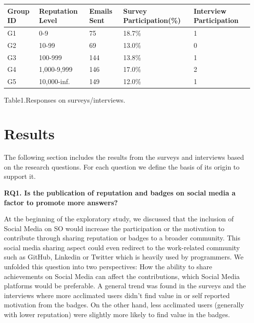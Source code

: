 \documentclass{sigchi}
\begin{document}
\begin{center}
    \begin{tabular}{ | p{1.0cm} | p{1.6cm} | P{0.9cm} | P{1.8cm} | P{1.4cm} |}
    \hline
    \textbf{Group ID} & \textbf{Reputation Level} & \textbf{Emails Sent} & \textbf{Survey Participation(\%)} & \textbf{Interview Participation } \\ \hline
    G1 & 0-9 & 75 & 18.7\% & 1 \\ \hline
    G2 & 10-99 & 69 & 13.0\% & 0 \\ \hline
    G3 & 100-999 & 144 & 13.8\% & 1 \\ \hline
    G4 & 1,000-9,999 & 146 & 17.0\% & 2 \\ \hline
    G5 & 10,000-inf. & 149 & 12.0\% & 1 \\ \hline
  \end{tabular}
  \bigskip
   Table1.Responses on surveys/interviews.
\end{center}

\section{Results}

The following section includes the results from the surveys and interviews based on the research questions. For each question we define the basis of its origin to support it.

\textbf{RQ1. Is the publication of reputation and badges on social media a factor to promote more answers?}

At the beginning of the exploratory study, we discussed that the inclusion of Social Media on SO would increase the participation or the motivation to contribute through sharing reputation or badges to a broader community. This social media sharing aspect could even redirect to the work-related community such as GitHub, Linkedin or Twitter which is heavily used by programmers. We unfolded this question into two perspectives: How the ability to share achievements on Social Media can affect the contributions,  which Social Media platforms would be preferable. A general trend was found in the surveys and the interviews where more acclimated users didn't find value in or self reported motivation from the badges. On the other hand, less acclimated users (generally with lower reputation) were slightly more likely to find value in the badges.
\end{document}
